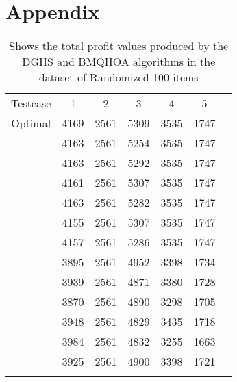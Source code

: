 \documentclass[titlepage]{article}
\begin{document}
\section{Appendix}
\begin{table}[!h]\centering
    \caption{\scriptsize Shows the total profit values produced by the DGHS and BMQHOA algorithms in the dataset of Randomized 100 items} \label{random100}
    \begin{tabu}{|c|c|c|c|c|c|c|}
        Testcase & 1 & 2 & 3 & 4 & 5 \\ [-1pt]  
        Optimal & 4169 & 2561 & 5309 & 3535 & 1747 \\ [-1pt]  
         & 4163 & 2561 & 5254 & 3535 & 1747 \\ 
        & 4163 & 2561 &5292 &3535 &1747 \\  
        &4161 &2561 &5307 &3535 &1747 \\  
        &4163 &2561 &5282 &3535 &1747 \\  
        &4155 &2561 &5307 &3535 &1747 \\  
        &4157 &2561 &5286 &3535 &1747 \\[-1pt] 
         &3895 &2561 &4952 &3398 &1734 \\ 
        &3939 &2561 &4871 &3380 &1728 \\ 
        &3870 &2561 &4890 &3298 &1705 \\ 
        &3948 &2561 &4829 &3435 &1718 \\ 
        &3984 &2561 &4832 &3255 &1663 \\ 
        &3925 &2561 &4900 &3398 &1721 \\[-1pt] 
    \end{tabu}
\end{table}
\end{document}
